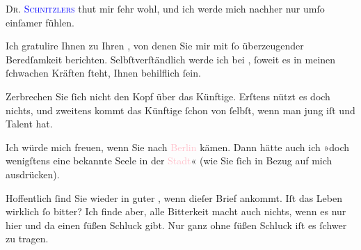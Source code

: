 \pstart
           \textsc{Dr. \textcolor{blue}{Schnitzlers}{}\ledrightnote{}}{ }\label{K_L03526-2v}\label{K_L03526-2h}{ } thut mir ſehr wohl, und ich werde mich nachher nur umſo einſamer fühlen.\pend
           
\pstart
           Ich gratulire Ihnen zu Ihren \label{K_L03526-3v}\label{K_L03526-3h}, von denen Sie mir mit
               ſo überzeugender Beredſamkeit berichten. {\pb}Selbſtverſtändlich werde ich bei \label{K_L03526-4v}\label{K_L03526-4h}, ſoweit es in meinen
               ſchwachen Kräften ſteht, Ihnen behilflich ſein.\pend
           
\pstart
           Zerbrechen Sie ſich nicht den Kopf über das Künftige. Erſtens nützt es doch nichts,
               und zweitens kommt das Künftige ſchon von ſelbſt, wenn man jung iſt und Talent
               hat.\pend
           
\pstart
           Ich würde mich freuen, wenn Sie nach \textcolor{pink}{Berlin}{}\ledrightnote{\textcolor{pink}{Berlin}}
               kämen. Dann hätte auch ich »doch wenigſtens eine bekannte Seele in der \textcolor{pink}{Stadt}{}\ledrightnote{{$\rightarrow$}\textcolor{pink}{Berlin}}« (wie Sie ſich in Bezug
               auf mich ausdrücken).\pend
           
\pstart
           {\pb}Hoffentlich ſind Sie wieder in guter \label{K_L03526-5v}\label{K_L03526-5h}, wenn
               dieſer Brief ankommt. Iſt das Leben wirklich ſo bitter? Ich finde aber, alle
               Bitterkeit macht auch nichts, wenn es \strikeout{\textcolor{gray}{richtig}}{ }\introOben{}nur\introOben{} hier und da einen ſüßen Schluck gibt. Nur ganz ohne \strikeout{\textcolor{gray}{Schluck}} ſüßen Schluck iſt es ſchwer zu tragen.\pend
           
